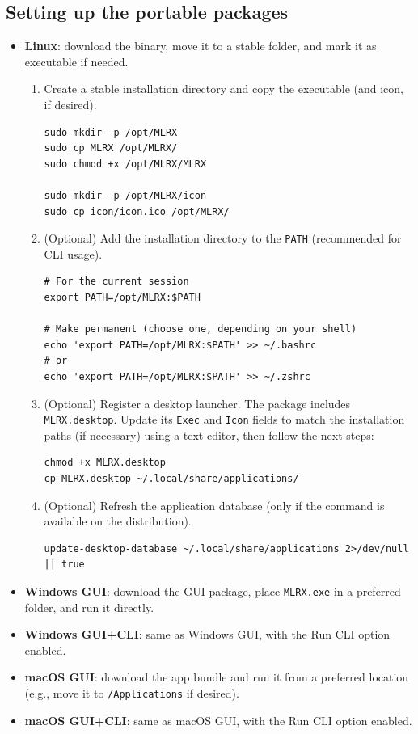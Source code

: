 \documentclass[11pt,a4paper]{article}
\begin{document}
\subsection{Setting up the portable packages}
\begin{itemize}
  \item \textbf{Linux}: download the binary, move it to a stable folder, and mark it as executable if needed.

  \begin{enumerate}[label=\arabic*.]
    \item Create a stable installation directory and copy the executable (and icon, if desired).
\begin{lstlisting}[style=mlrx]
sudo mkdir -p /opt/MLRX
sudo cp MLRX /opt/MLRX/
sudo chmod +x /opt/MLRX/MLRX

sudo mkdir -p /opt/MLRX/icon
sudo cp icon/icon.ico /opt/MLRX/
\end{lstlisting}

    \item (Optional) Add the installation directory to the \texttt{PATH} (recommended for CLI usage).
\begin{lstlisting}[style=mlrx]
# For the current session
export PATH=/opt/MLRX:$PATH

# Make permanent (choose one, depending on your shell)
echo 'export PATH=/opt/MLRX:$PATH' >> ~/.bashrc
# or
echo 'export PATH=/opt/MLRX:$PATH' >> ~/.zshrc
\end{lstlisting}

    \item (Optional) Register a desktop launcher. The package includes \texttt{MLRX.desktop}. Update its \texttt{Exec} and \texttt{Icon} fields to match the installation paths (if necessary) using a text editor, then follow the next steps:
\begin{lstlisting}[style=mlrx]
chmod +x MLRX.desktop
cp MLRX.desktop ~/.local/share/applications/
\end{lstlisting}

    \item (Optional) Refresh the application database (only if the command is available on the distribution).
\begin{lstlisting}[style=mlrx]
update-desktop-database ~/.local/share/applications 2>/dev/null || true
\end{lstlisting}
  \end{enumerate}
  \item \textbf{Windows GUI}: download the GUI package, place \texttt{MLRX.exe} in a preferred folder, and run it directly.
  \item \textbf{Windows GUI+CLI}: same as Windows GUI, with the Run CLI option enabled.
  \item \textbf{macOS GUI}: download the app bundle and run it from a preferred location (e.g., move it to \texttt{/Applications} if desired).
  \item \textbf{macOS GUI+CLI}: same as macOS GUI, with the Run CLI option enabled.
\end{itemize}
\end{document}
